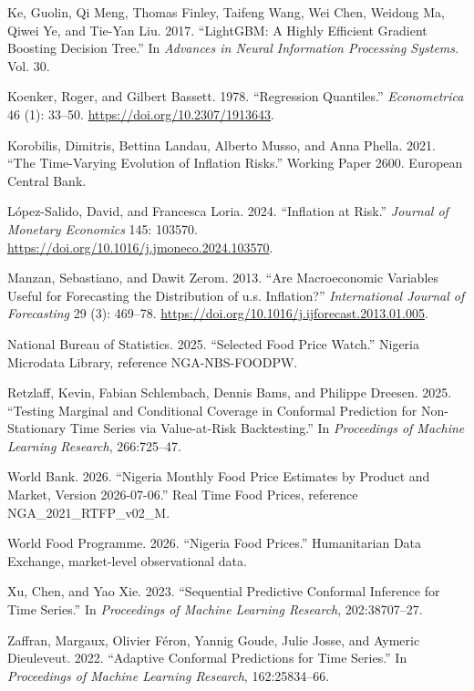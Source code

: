 \begin{CSLReferences}{1}{0}
Ke, Guolin, Qi Meng, Thomas Finley, Taifeng Wang, Wei Chen, Weidong Ma,
Qiwei Ye, and Tie-Yan Liu. 2017. {``{LightGBM}: A Highly Efficient
Gradient Boosting Decision Tree.''} In \emph{Advances in Neural
Information Processing Systems}. Vol. 30.

Koenker, Roger, and Gilbert Bassett. 1978. {``Regression Quantiles.''}
\emph{Econometrica} 46 (1): 33--50.
\url{https://doi.org/10.2307/1913643}.

Korobilis, Dimitris, Bettina Landau, Alberto Musso, and Anna Phella.
2021. {``The Time-Varying Evolution of Inflation Risks.''} Working Paper
2600. European Central Bank.

López-Salido, David, and Francesca Loria. 2024. {``Inflation at Risk.''}
\emph{Journal of Monetary Economics} 145: 103570.
\url{https://doi.org/10.1016/j.jmoneco.2024.103570}.

Manzan, Sebastiano, and Dawit Zerom. 2013. {``Are Macroeconomic
Variables Useful for Forecasting the Distribution of u.s. Inflation?''}
\emph{International Journal of Forecasting} 29 (3): 469--78.
\url{https://doi.org/10.1016/j.ijforecast.2013.01.005}.

National Bureau of Statistics. 2025. {``Selected Food Price Watch.''}
Nigeria Microdata Library, reference NGA-NBS-FOODPW.

Retzlaff, Kevin, Fabian Schlembach, Dennis Bams, and Philippe Dreesen.
2025. {``Testing Marginal and Conditional Coverage in Conformal
Prediction for Non-Stationary Time Series via Value-at-Risk
Backtesting.''} In \emph{Proceedings of Machine Learning Research},
266:725--47.

World Bank. 2026. {``Nigeria Monthly Food Price Estimates by Product and
Market, Version 2026-07-06.''} Real Time Food Prices, reference
NGA\_2021\_RTFP\_v02\_M.

World Food Programme. 2026. {``Nigeria Food Prices.''} Humanitarian Data
Exchange, market-level observational data.

Xu, Chen, and Yao Xie. 2023. {``Sequential Predictive Conformal
Inference for Time Series.''} In \emph{Proceedings of Machine Learning
Research}, 202:38707--27.

Zaffran, Margaux, Olivier Féron, Yannig Goude, Julie Josse, and Aymeric
Dieuleveut. 2022. {``Adaptive Conformal Predictions for Time Series.''}
In \emph{Proceedings of Machine Learning Research}, 162:25834--66.

\end{CSLReferences}
